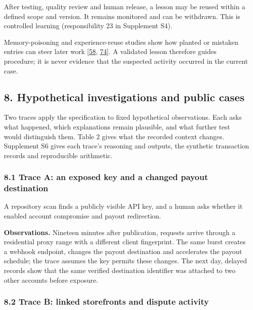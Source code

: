 \documentclass[
  11pt,
]{article}
\begin{document}
After testing, quality review and human release, a lesson may be reused
within a defined scope and version. It remains monitored and can be
withdrawn. This is controlled learning (responsibility 23 in Supplement
S4).

Memory-poisoning and experience-reuse studies show how planted or
mistaken entries can steer later work
{[}\protect\hyperlink{ref-Dash2026}{58},
\protect\hyperlink{ref-Xiong2026MemoryManagement}{74}{]}. A validated
lesson therefore guides procedure; it is never evidence that the
suspected activity occurred in the current case.

\FloatBarrier

\hypertarget{hypothetical-investigations-and-public-cases}{%
\subsection{8. Hypothetical investigations and public
cases}\label{hypothetical-investigations-and-public-cases}}

\suppressfloats[t]

Two traces apply the specification to fixed hypothetical observations.
Each asks what happened, which explanations remain plausible, and what
further test would distinguish them. Table 2 gives what the recorded
context changes. Supplement S6 gives each trace's reasoning and outputs,
the synthetic transaction records and reproducible arithmetic.

\hypertarget{trace-a-an-exposed-key-and-a-changed-payout-destination}{%
\subsubsection{8.1 Trace A: an exposed key and a changed payout
destination}\label{trace-a-an-exposed-key-and-a-changed-payout-destination}}

A repository scan finds a publicly visible API key, and a human asks
whether it enabled account compromise and payout redirection.

\textbf{Observations.} Nineteen minutes after publication, requests
arrive through a residential proxy range with a different client
fingerprint. The same burst creates a webhook endpoint, changes the
payout destination and accelerates the payout schedule; the trace
assumes the key permits these changes. The next day, delayed records
show that the same verified destination identifier was attached to two
other accounts before exposure.

\hypertarget{trace-b-linked-storefronts-and-dispute-activity}{%
\subsubsection{8.2 Trace B: linked storefronts and dispute
activity}\label{trace-b-linked-storefronts-and-dispute-activity}}
\end{document}
